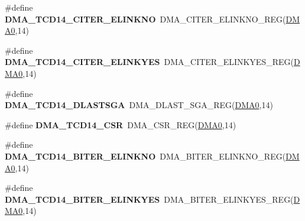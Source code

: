\begin{DoxyCompactItemize}
\item 
\#define {\bfseries D\+M\+A\+\_\+\+T\+C\+D14\+\_\+\+C\+I\+T\+E\+R\+\_\+\+E\+L\+I\+N\+K\+NO}~D\+M\+A\+\_\+\+C\+I\+T\+E\+R\+\_\+\+E\+L\+I\+N\+K\+N\+O\+\_\+\+R\+EG(\hyperlink{group__DMA__Peripheral__Access__Layer_ga4103044f9ca209772f513dc694513ffb}{D\+M\+A0},14)\hypertarget{group__DMA__Register__Accessor__Macros_ga15a7687794a55a2cdfbbf2601b9775a5}{}\label{group__DMA__Register__Accessor__Macros_ga15a7687794a55a2cdfbbf2601b9775a5}

\item 
\#define {\bfseries D\+M\+A\+\_\+\+T\+C\+D14\+\_\+\+C\+I\+T\+E\+R\+\_\+\+E\+L\+I\+N\+K\+Y\+ES}~D\+M\+A\+\_\+\+C\+I\+T\+E\+R\+\_\+\+E\+L\+I\+N\+K\+Y\+E\+S\+\_\+\+R\+EG(\hyperlink{group__DMA__Peripheral__Access__Layer_ga4103044f9ca209772f513dc694513ffb}{D\+M\+A0},14)\hypertarget{group__DMA__Register__Accessor__Macros_gabb6dadb79352c6af3a1e860d6a010a15}{}\label{group__DMA__Register__Accessor__Macros_gabb6dadb79352c6af3a1e860d6a010a15}

\item 
\#define {\bfseries D\+M\+A\+\_\+\+T\+C\+D14\+\_\+\+D\+L\+A\+S\+T\+S\+GA}~D\+M\+A\+\_\+\+D\+L\+A\+S\+T\+\_\+\+S\+G\+A\+\_\+\+R\+EG(\hyperlink{group__DMA__Peripheral__Access__Layer_ga4103044f9ca209772f513dc694513ffb}{D\+M\+A0},14)\hypertarget{group__DMA__Register__Accessor__Macros_ga7a9291c9148fe72fcaa6daf2a8fdd83e}{}\label{group__DMA__Register__Accessor__Macros_ga7a9291c9148fe72fcaa6daf2a8fdd83e}

\item 
\#define {\bfseries D\+M\+A\+\_\+\+T\+C\+D14\+\_\+\+C\+SR}~D\+M\+A\+\_\+\+C\+S\+R\+\_\+\+R\+EG(\hyperlink{group__DMA__Peripheral__Access__Layer_ga4103044f9ca209772f513dc694513ffb}{D\+M\+A0},14)\hypertarget{group__DMA__Register__Accessor__Macros_gac1607d5f48957b2d42b1c77f4ffe1ed9}{}\label{group__DMA__Register__Accessor__Macros_gac1607d5f48957b2d42b1c77f4ffe1ed9}

\item 
\#define {\bfseries D\+M\+A\+\_\+\+T\+C\+D14\+\_\+\+B\+I\+T\+E\+R\+\_\+\+E\+L\+I\+N\+K\+NO}~D\+M\+A\+\_\+\+B\+I\+T\+E\+R\+\_\+\+E\+L\+I\+N\+K\+N\+O\+\_\+\+R\+EG(\hyperlink{group__DMA__Peripheral__Access__Layer_ga4103044f9ca209772f513dc694513ffb}{D\+M\+A0},14)\hypertarget{group__DMA__Register__Accessor__Macros_ga9798a8bd49bf56c6247968ec1847ba56}{}\label{group__DMA__Register__Accessor__Macros_ga9798a8bd49bf56c6247968ec1847ba56}

\item 
\#define {\bfseries D\+M\+A\+\_\+\+T\+C\+D14\+\_\+\+B\+I\+T\+E\+R\+\_\+\+E\+L\+I\+N\+K\+Y\+ES}~D\+M\+A\+\_\+\+B\+I\+T\+E\+R\+\_\+\+E\+L\+I\+N\+K\+Y\+E\+S\+\_\+\+R\+EG(\hyperlink{group__DMA__Peripheral__Access__Layer_ga4103044f9ca209772f513dc694513ffb}{D\+M\+A0},14)\hypertarget{group__DMA__Register__Accessor__Macros_ga37d94f14acca967633fbc56dac680274}{}\label{group__DMA__Register__Accessor__Macros_ga37d94f14acca967633fbc56dac680274}


\end{DoxyCompactItemize}
